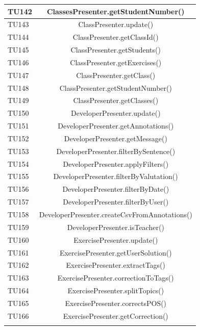 \begin{longtable}{|>{\centering\arraybackslash}m{1.6cm}|c|}
		\rowcolor{LightGray}
		TU142 & ClassesPresenter.getStudentNumber()\\ \hline
		TU143 & ClassPresenter.update()\\ \hline
		\rowcolor{LightGray}
		TU144 & ClassPresenter.getClassId()\\ \hline
		TU145 & ClassPresenter.getStudents()\\ \hline
		\rowcolor{LightGray}
		TU146 & ClassPresenter.getExercises()\\ \hline
		TU147 & ClassPresenter.getClass()\\ \hline
		\rowcolor{LightGray}
		TU148 & ClassPresenter.getStudentNumber()\\ \hline
		TU149 & ClassPresenter.getClasses()\\ \hline
		\rowcolor{LightGray}
		TU150 & DeveloperPresenter.update()\\ \hline
		TU151 & DeveloperPresenter.getAnnotations()\\ \hline
		\rowcolor{LightGray}
		TU152 & DeveloperPresenter.getMessage()\\ \hline
		TU153 & DeveloperPresenter.filterBySentence()\\ \hline
		\rowcolor{LightGray}
		TU154 & DeveloperPresenter.applyFilters()\\ \hline
		TU155 & DeveloperPresenter.filterByValutation()\\ \hline
		\rowcolor{LightGray}
		TU156 & DeveloperPresenter.filterByDate()\\ \hline
		TU157 & DeveloperPresenter.filterByUser()\\ \hline
		\rowcolor{LightGray}
		TU158 & DeveloperPresenter.createCsvFromAnnotations()\\ \hline
		\rowcolor{LightGray}
		TU159 & DeveloperPresenter.isTeacher()\\ \hline
		TU160 & ExercisePresenter.update()\\ \hline
		\rowcolor{LightGray}
		TU161 & ExercisePresenter.getUserSolution()\\ \hline
		TU162 & ExercisePresenter.extractTags()\\ \hline
		\rowcolor{LightGray}
		TU163 & ExercisePresenter.correctionToTags()\\ \hline
		TU164 & ExercisePresenter.splitTopics()\\ \hline
		\rowcolor{LightGray}
		TU165 & ExercisePresenter.correctsPOS()\\ \hline
		TU166 & ExercisePresenter.getCorrection()\\ \hline
		\rowcolor{LightGray}

\end{longtable}
